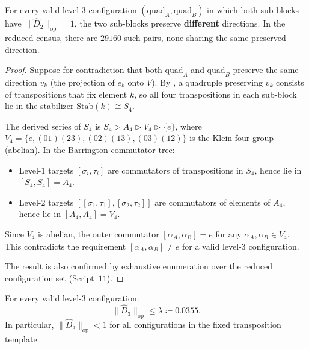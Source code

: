\documentclass[version=final]{iacrcc}
\newcommand{\norm}[1]{\lVert #1 \rVert}
\newcommand{\opn}[1]{\norm{#1}_{\mathrm{op}}}
\newcommand{\Dhat}{\widehat{D}}
\begin{document}
\begin{lemma}
\label{lem:mixing}
For every valid level-$3$ configuration $(\mathrm{quad}_A, \mathrm{quad}_B)$
in which both sub-blocks have $\opn{\Dhat_2} = 1$, the two sub-blocks
preserve \textbf{different} directions. In the reduced census, there are
$29160$ such pairs, none sharing the same preserved direction.
\end{lemma}

\begin{proof}
Suppose for contradiction that both $\mathrm{quad}_A$ and $\mathrm{quad}_B$
preserve the same direction $v_k$ (the projection of $e_k$ onto $V$).
By , a quadruple preserving $v_k$ consists of transpositions
that fix element $k$, so all four transpositions in each sub-block lie in
the stabilizer $\mathrm{Stab}(k) \cong S_4$.

The derived series of $S_4$ is
$S_4 \rhd A_4 \rhd V_4 \rhd \{e\}$,
where $V_4 = \{e, (01)(23), (02)(13), (03)(12)\}$ is the Klein four-group
(abelian).  In the Barrington commutator tree:
\begin{itemize}[nosep]
\item Level-$1$ targets $[\sigma_i, \tau_i]$ are commutators of transpositions
  in $S_4$, hence lie in $[S_4, S_4] = A_4$.
\item Level-$2$ targets $[[\sigma_1,\tau_1],[\sigma_2,\tau_2]]$ are
  commutators of elements of $A_4$, hence lie in $[A_4, A_4] = V_4$.
\end{itemize}
Since $V_4$ is abelian, the outer commutator
$[\alpha_A, \alpha_B] = e$ for any $\alpha_A, \alpha_B \in V_4$.
This contradicts the requirement $[\alpha_A, \alpha_B] \neq e$ for a
valid level-$3$ configuration.

The result is also confirmed by exhaustive enumeration over the reduced
configuration set (Script~$11$).
\end{proof}

\begin{theorem}
\label{thm:level23}
For every valid level-$3$ configuration:
\[
\opn{\Dhat_3} \leq \lambda \coloneqq 0.0355.
\]
In particular, $\opn{\Dhat_3} < 1$ for all configurations in the fixed
transposition template.
\end{theorem}
\end{document}
